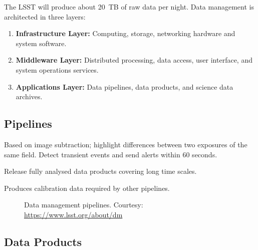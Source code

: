 \documentclass[12pt,a4paper]{article}
\begin{document}
The LSST will produce about 20~TB of raw data per night. Data management is
architected in three layers:

\begin{enumerate}[leftmargin=*]
  \item \textbf{Infrastructure Layer:} Computing, storage, networking hardware
        and system software.
  \item \textbf{Middleware Layer:} Distributed processing, data access, user
        interface, and system operations services.
  \item \textbf{Applications Layer:} Data pipelines, data products, and
        science data archives.
\end{enumerate}

\subsection{Pipelines}

\begin{description}[leftmargin=*]
  \item[Nightly Pipelines] Based on image subtraction; highlight differences
        between two exposures of the same field. Detect transient events and
        send alerts within 60 seconds.
  \item[Data Release Pipelines] Release fully analysed data products covering
        long time scales.
  \item[Calibration Products Pipeline] Produces calibration data required by
        other pipelines.
\end{description}

\begin{figure}[htbp]
  \centering
  \caption{Data management pipelines.
           Courtesy: \url{https://www.lsst.org/about/dm}}
  \label{fig:pipelines}
\end{figure}

\subsection{Data Products}
\end{document}
